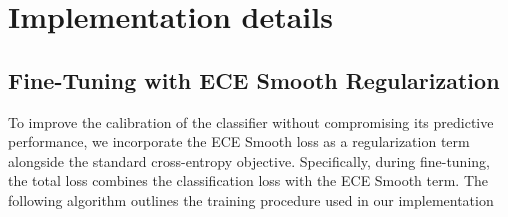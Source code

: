 \documentclass{article}
\begin{document}
\section{Implementation details} \label{imp}
\subsection{Fine-Tuning with ECE Smooth Regularization} \label{eceimp}


To improve the calibration of the classifier without compromising its predictive performance, we incorporate the ECE Smooth loss as a regularization term alongside the standard cross-entropy objective. Specifically, during fine-tuning, the total loss combines the classification loss with the ECE Smooth term. The following algorithm outlines the training procedure used in our implementation
\end{document}
